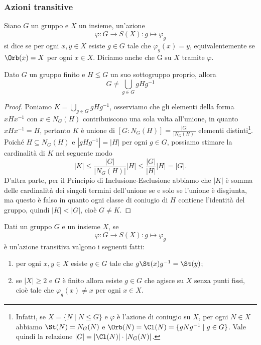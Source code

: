\documentclass[11pt]{scrartcl}
\begin{document}
\subsubsection{Azioni transitive}

\begin{definition}
    Siano $G$ un gruppo e $X$ un insieme, un'azione \[
        \varphi:G\longrightarrow S(X) :g \longmapsto \varphi_g
    \]si dice  se per ogni $x, y \in X$ esiste $g \in G$
    tale che $\varphi_g(x) = y$, equivalentemente se $\Orb(x) = X$ per ogni 
    $x \in X$. Diciamo anche che G  su $X$ 
    tramite $\varphi$.
\end{definition}

\begin{lemma}
    \label{lemma1.40}
    Dato $G$ un gruppo finito e $H \lneq G$ un suo sottogruppo proprio, allora \[
        G \neq \bigcup_{g \in G}gHg^{-1}
    \]
\end{lemma}

\begin{proof}
    Poniamo $K = \displaystyle\bigcup_{g \in G}gHg^{-1}$, osserviamo che gli
    elementi della forma $xHx^{-1}$ con $x \in N_G(H)$ contribuiscono una
    sola volta all'unione, in quanto $xHx^{-1} = H$, pertanto $K$
    è unione di $[G:N_G(H)] = \displaystyle\frac{|G|}{|N_G(H)|}$ elementi distinti\footnote
    {Infatti, se $X = \{N\mid N\leqslant G\}$ e $\varphi$ è l'azione di coniugio
    su $X$, per ogni $N \in X$ abbiamo $\St(N) = N_G(N)$ e $\Orb(N) = \Cl(N) =
    \{gNg^{-1}\mid g \in G\}$. Vale quindi la relazione $|G| = |\Cl(N)|\cdot|N_G(N)|$.}. Poiché
    $H \subseteq N_G(H)$ e $|gHg^{-1}| = |H|$ per ogni $g \in G$, possiamo stimare 
    la cardinalità di $K$ nel seguente modo 
    \[
        |K| \leq\frac{|G|}{|N_G(H)|}|H| \leq\frac{|G|}{|H|}|H| = |G|.
    \]D'altra parte, per il Principio di Inclusione-Esclusione abbiamo che $|K|$ 
    è somma delle cardinalità dei singoli termini dell'unione se e solo se 
    l'unione è disgiunta, ma questo è falso in quanto ogni classe di coniugio
    di $H$ contiene l'identità del gruppo, quindi $|K| < |G|$, cioè $G \neq K$.
\end{proof}

\begin{proposition}
    \label{prop1.41}
    Dati un gruppo $G$ e un insieme $X$, se 
    \[
        \varphi:G\longrightarrow S(X) :g\longmapsto \varphi_g
    \]è un'azione transitiva valgono i seguenti fatti:
    \begin{enumerate}[(1)]
        \item per ogni $x, y \in X$ esiste $g \in G$ tale che $g\St(x)g^{-1} = \St(y)$;
        \item se $|X|\geqslant 2$ e $G$ è finito allora esiste $g \in G$ che agisce su $X$ senza
        punti fissi, cioè tale che $\varphi_g(x) \neq x$ per ogni $x \in X$.
    \end{enumerate}
\end{proposition}
\end{document}
